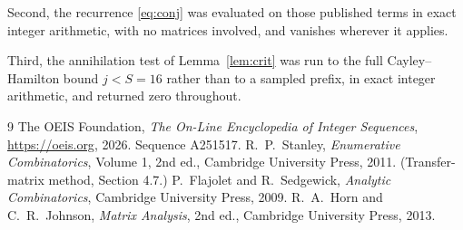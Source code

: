 \documentclass[11pt,a4paper]{article}
\theoremstyle{plain}
\theoremstyle{definition}
\begin{document}
Second, the recurrence \eqref{eq:conj} was evaluated on those published terms in exact
integer arithmetic, with no matrices involved, and vanishes wherever it applies.

Third, the annihilation test of Lemma~\ref{lem:crit} was run to the full Cayley--Hamilton
bound $j<S=16$ rather than to a sampled prefix, in exact integer arithmetic, and returned
zero throughout.

\begin{thebibliography}{9}
 The OEIS Foundation, \emph{The On-Line Encyclopedia of Integer
Sequences}, \url{https://oeis.org}, 2026. Sequence A251517.
 R.~P.~Stanley, \emph{Enumerative Combinatorics}, Volume 1, 2nd ed.,
Cambridge University Press, 2011. (Transfer-matrix method, Section 4.7.)
 P.~Flajolet and R.~Sedgewick, \emph{Analytic Combinatorics}, Cambridge
University Press, 2009.
 R.~A.~Horn and C.~R.~Johnson, \emph{Matrix Analysis}, 2nd ed., Cambridge
University Press, 2013.
\end{thebibliography}
\end{document}
